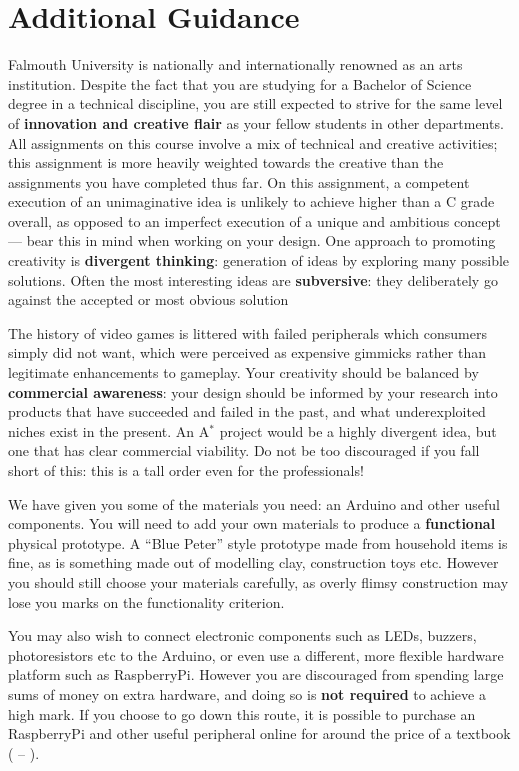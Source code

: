 \documentclass{../fal_assignment}
\begin{document}
\section*{Additional Guidance}

Falmouth University is nationally and internationally renowned as an arts institution.
Despite the fact that you are studying for a Bachelor of Science degree in a technical discipline,
you are still expected to strive for the same level of \textbf{innovation and creative flair}
as your fellow students in other departments.
All assignments on this course involve a mix of technical and creative activities;
this assignment is more heavily weighted towards the creative than the assignments you have completed thus far.
On this assignment, a competent execution of an unimaginative idea is unlikely to achieve higher than a C grade overall,
as opposed to an imperfect execution of a unique and ambitious concept
--- bear this in mind when working on your design.
One approach to promoting creativity is
\textbf{divergent thinking}: generation of ideas by exploring many possible solutions.
Often the most interesting ideas are \textbf{subversive}: they deliberately go against the
accepted or most obvious solution

The history of video games is littered with failed peripherals which consumers simply did not want,
which were perceived as expensive gimmicks rather than legitimate enhancements to gameplay.
Your creativity should be balanced by \textbf{commercial awareness}:
your design should be informed by your research into products that have succeeded and failed
in the past, and what underexploited niches exist in the present.
An A$^*$ project would be a highly divergent idea, but one that has clear commercial viability.
Do not be too discouraged if you fall short of this: this is a tall order even for the professionals!

We have given you some of the materials you need: an Arduino and other useful components.
You will need to add your own materials to produce a \textbf{functional} physical prototype.
A ``Blue Peter'' style prototype made from household items is fine,
as is something made out of modelling clay, construction toys etc.
However you should still choose your materials carefully, as overly flimsy construction may
lose you marks on the functionality criterion.

You may also wish to connect electronic components such as LEDs, buzzers, photoresistors etc to the Arduino,
or even use a different, more flexible hardware platform such as RaspberryPi.
However you are discouraged from spending large sums of money on extra hardware,
and doing so is \textbf{not required} to achieve a high mark.
If you choose to go down this route,
it is possible to purchase an RaspberryPi and other useful peripheral online for 
around the price of a textbook ( -- ).
\end{document}
